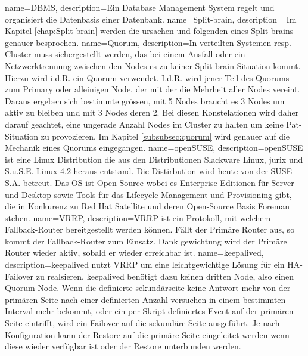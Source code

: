 {
        name=DBMS,
        description={Ein Database Management System regelt und organisiert die Datenbasis einer Datenbank\cite{8XWD67EM}.}
}
{
        name=Split-brain,
        description={
%        
        Im Kapitel \autoref{chap:Split-brain} werden die ursachen und folgenden eines Split-brains genauer besprochen.
        }
}
{
        name=Quorum,
        description={In verteilten Systemen resp. Cluster muss sichergestellt werden, das bei einem Ausfall oder ein Netzwerktrennung zwischen den Nodes es zu keiner \Gls{Split-brain}-Situation kommt.
        Hierzu wird i.d.R. ein Quorum verwendet.
        I.d.R. wird jener Teil des Quorums zum Primary oder alleinigen Node, der mit der die Mehrheit aller Nodes vereint. Daraus ergeben sich bestimmte grössen, mit 5 Nodes braucht es 3 Nodes um aktiv zu bleiben und mit 3 Nodes deren 2.
        Bei diesen Konstelationen wird daher darauf geachtet, eine ungerade Anzahl Nodes im Cluster zu halten um keine Pat-Situation zu provozieren.
%        
        Im Kapitel \autoref{subsubsec:quorum} wird genauer auf die Mechanik eines Quorums eingegangen.
        }
}
{
        name=openSUSE,
        description={openSUSE ist eine Linux Distribution die aus den Distributionen Slackware Linux, jurix und S.u.S.E. Linux 4.2 heraus entstand.
        Die Distirbution wird heute von der SUSE S.A. betreut.
        Das OS ist Open-Source wobei es Enterprise Editionen für Server und Desktop sowie Tools für das Lifecycle Management und Provisioning gibt,
        die in Konkurenz zu Red Hat Satellite und deren Open-Source Basis \Gls{Foreman} stehen.}
}
{
        name=VRRP,
        description={VRRP ist ein Protokoll, mit welchem Fallback-Router bereitgestellt werden können.
        Fällt der Primäre Router aus, so kommt der Fallback-Router zum Einsatz.
        Dank gewichtung wird der Primäre Router wieder aktiv, sobald er wieder erreichbar ist\cite{F5RKQYW6, Y3WHQB32}.}
}
{
        name=keepalived,
        description={keepalived nutzt \Gls{VRRP} um eine leichtgewichtige Lösung für ein HA-\Gls{Failover} zu realsieren.
        keepalived benötigt dazu keinen dritten Node, also einen \Gls{Quorum}-Node.
        Wenn die definierte sekundärseite keine Antwort mehr von der primären Seite nach einer definierten Anzahl versuchen in einem bestimmten Interval mehr bekommt,
        oder ein per Skript definiertes Event auf der primären Seite eintrifft, wird ein \Gls{Failover} auf die sekundäre Seite ausgeführt.
        Je nach Konfiguration kann der Restore auf die primäre Seite eingeleitet werden wenn diese wieder verfügbar ist oder der Restore unterbunden werden\cite{5IP362SV,ZW4PA3EQ}.}
}
